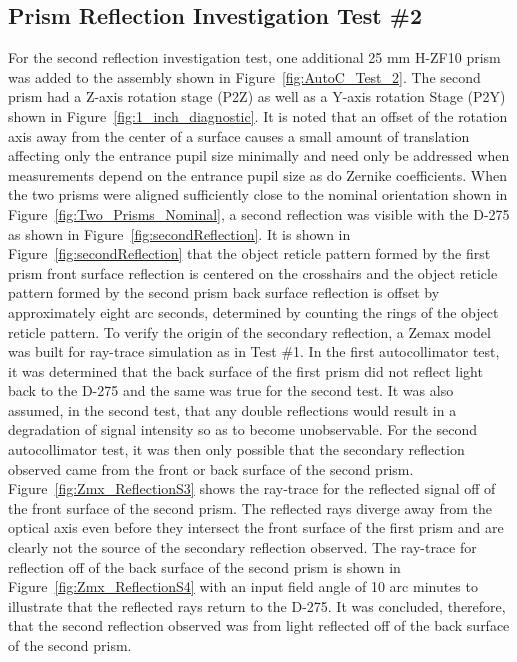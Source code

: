 \subsection{Prism Reflection Investigation Test \#2}
\label{sec:prismTest_2}
For the second reflection investigation test, one additional 25 mm H-ZF10 prism was added to the assembly shown in Figure~\ref{fig:AutoC_Test_2}. The second prism had a Z-axis rotation stage (P2Z) as well as a Y-axis rotation Stage (P2Y) shown in Figure~\ref{fig:1_inch_diagnostic}. It is noted that an offset of the rotation axis away from the center of a surface causes a small amount of translation affecting only the entrance pupil size minimally and need only be addressed when measurements depend on the entrance pupil size as do Zernike coefficients. When the two prisms were aligned sufficiently close to the nominal orientation shown in Figure~\ref{fig:Two_Prisms_Nominal}, a second reflection was visible with the D-275 as shown in Figure~\ref{fig:secondReflection}. It is shown in Figure~\ref{fig:secondReflection} that the object reticle pattern formed by the first prism front surface reflection is centered on the crosshairs and the object reticle pattern formed by the second prism back surface reflection is offset by approximately eight arc seconds, determined by counting the rings of the object reticle pattern. To verify the origin of the secondary reflection, a Zemax model was built for ray-trace simulation as in Test \#1. In the first autocollimator test, it was determined that the back surface of the first prism did not reflect light back to the D-275 and the same was true for the second test. It was also assumed, in the second test, that any double reflections would result in a degradation of signal intensity so as to become unobservable. For the second autocollimator test, it was then only possible that the secondary reflection observed came from the front or back surface of the second prism. Figure~\ref{fig:Zmx_ReflectionS3} shows the ray-trace for the reflected signal off of the front surface of the second prism. The reflected rays diverge away from the optical axis even before they intersect the front surface of the first prism and are clearly not the source of the secondary reflection observed. The ray-trace for reflection off of the back surface of the second prism is shown in Figure~\ref{fig:Zmx_ReflectionS4} with an input field angle of 10 arc minutes to illustrate that the reflected rays return to the D-275. It was concluded, therefore, that the second reflection observed was from light reflected off of the back surface of the second prism.

